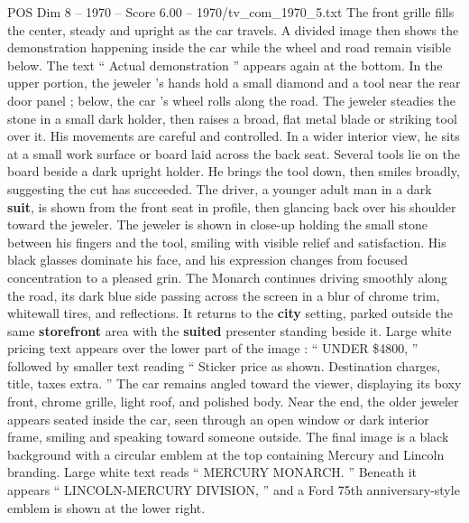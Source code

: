 \begin{textsample}{POS Dim 8 – 1970 – Score 6.00 – 1970/tv\_com\_1970\_5.txt}
The front grille fills the center, steady and upright as the car travels.
A divided image then shows the demonstration happening inside the car while the wheel and road remain visible below.
The text “ Actual demonstration ” appears again at the bottom.
In the upper portion, the jeweler ’s hands hold a small diamond and a tool near the rear door panel ; below, the car ’s wheel rolls along the road.
The jeweler steadies the stone in a small dark holder, then raises a broad, flat metal blade or striking tool over it.
His movements are careful and controlled.
In a wider interior view, he sits at a small work surface or board laid across the back seat.
Several tools lie on the board beside a dark upright holder.
He brings the tool down, then smiles broadly, suggesting the cut has succeeded.
The driver, a younger adult man in a dark \textbf{suit}, is shown from the front seat in profile, then glancing back over his shoulder toward the jeweler.
The jeweler is shown in close-up holding the small stone between his fingers and the tool, smiling with visible relief and satisfaction.
His black glasses dominate his face, and his expression changes from focused concentration to a pleased grin.
The Monarch continues driving smoothly along the road, its dark blue side passing across the screen in a blur of chrome trim, whitewall tires, and reflections.
It returns to the \textbf{city} setting, parked outside the same \textbf{storefront} area with the \textbf{suited} presenter standing beside it.
Large white pricing text appears over the lower part of the image : “ UNDER \$4800, ” followed by smaller text reading “ Sticker price as shown.
Destination charges, title, taxes extra. ” The car remains angled toward the viewer, displaying its boxy front, chrome grille, light roof, and polished body.
Near the end, the older jeweler appears seated inside the car, seen through an open window or dark interior frame, smiling and speaking toward someone outside.
The final image is a black background with a circular emblem at the top containing Mercury and Lincoln branding.
Large white text reads “ MERCURY MONARCH. ” Beneath it appears “ LINCOLN-MERCURY DIVISION, ” and a Ford 75th anniversary-style emblem is shown at the lower right.

\end{textsample}
